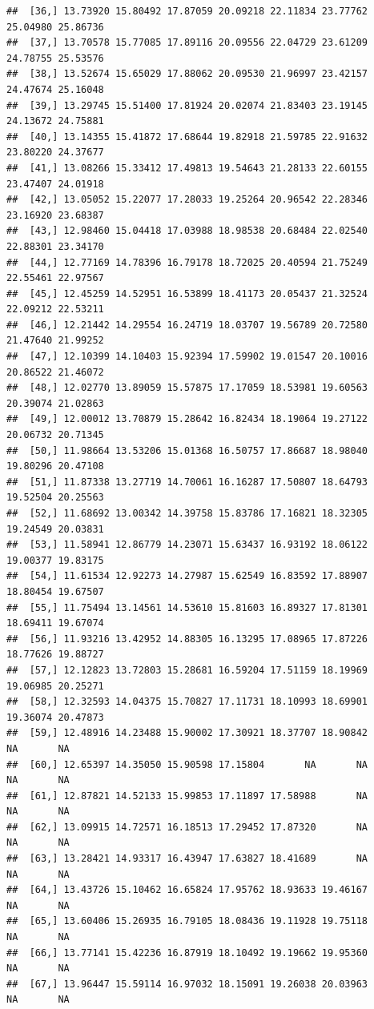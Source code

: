 \documentclass{article}\usepackage[]{graphicx}\usepackage[]{color}
\makeatletter
\newenvironment{kframe}{%
 \def\at@end@of@kframe{}%
 \ifinner\ifhmode%
  \def\at@end@of@kframe{\end{minipage}}%
  \begin{minipage}{\columnwidth}%
 \fi\fi%
 \def\FrameCommand##1{\hskip\@totalleftmargin \hskip-\fboxsep
 \colorbox{shadecolor}{##1}\hskip-\fboxsep
     \hskip-\linewidth \hskip-\@totalleftmargin \hskip\columnwidth}%
 \MakeFramed {\advance\hsize-\width
   \@totalleftmargin\z@ \linewidth\hsize
   \@setminipage}}%
 {\par\unskip\endMakeFramed%
 \at@end@of@kframe}
\newenvironment{knitrout}{}{} %
\makeatother
\begin{document}
\begin{knitrout}
\begin{kframe}
\begin{verbatim}
##  [36,] 13.73920 15.80492 17.87059 20.09218 22.11834 23.77762 25.04980 25.86736
##  [37,] 13.70578 15.77085 17.89116 20.09556 22.04729 23.61209 24.78755 25.53576
##  [38,] 13.52674 15.65029 17.88062 20.09530 21.96997 23.42157 24.47674 25.16048
##  [39,] 13.29745 15.51400 17.81924 20.02074 21.83403 23.19145 24.13672 24.75881
##  [40,] 13.14355 15.41872 17.68644 19.82918 21.59785 22.91632 23.80220 24.37677
##  [41,] 13.08266 15.33412 17.49813 19.54643 21.28133 22.60155 23.47407 24.01918
##  [42,] 13.05052 15.22077 17.28033 19.25264 20.96542 22.28346 23.16920 23.68387
##  [43,] 12.98460 15.04418 17.03988 18.98538 20.68484 22.02540 22.88301 23.34170
##  [44,] 12.77169 14.78396 16.79178 18.72025 20.40594 21.75249 22.55461 22.97567
##  [45,] 12.45259 14.52951 16.53899 18.41173 20.05437 21.32524 22.09212 22.53211
##  [46,] 12.21442 14.29554 16.24719 18.03707 19.56789 20.72580 21.47640 21.99252
##  [47,] 12.10399 14.10403 15.92394 17.59902 19.01547 20.10016 20.86522 21.46072
##  [48,] 12.02770 13.89059 15.57875 17.17059 18.53981 19.60563 20.39074 21.02863
##  [49,] 12.00012 13.70879 15.28642 16.82434 18.19064 19.27122 20.06732 20.71345
##  [50,] 11.98664 13.53206 15.01368 16.50757 17.86687 18.98040 19.80296 20.47108
##  [51,] 11.87338 13.27719 14.70061 16.16287 17.50807 18.64793 19.52504 20.25563
##  [52,] 11.68692 13.00342 14.39758 15.83786 17.16821 18.32305 19.24549 20.03831
##  [53,] 11.58941 12.86779 14.23071 15.63437 16.93192 18.06122 19.00377 19.83175
##  [54,] 11.61534 12.92273 14.27987 15.62549 16.83592 17.88907 18.80454 19.67507
##  [55,] 11.75494 13.14561 14.53610 15.81603 16.89327 17.81301 18.69411 19.67074
##  [56,] 11.93216 13.42952 14.88305 16.13295 17.08965 17.87226 18.77626 19.88727
##  [57,] 12.12823 13.72803 15.28681 16.59204 17.51159 18.19969 19.06985 20.25271
##  [58,] 12.32593 14.04375 15.70827 17.11731 18.10993 18.69901 19.36074 20.47873
##  [59,] 12.48916 14.23488 15.90002 17.30921 18.37707 18.90842       NA       NA
##  [60,] 12.65397 14.35050 15.90598 17.15804       NA       NA       NA       NA
##  [61,] 12.87821 14.52133 15.99853 17.11897 17.58988       NA       NA       NA
##  [62,] 13.09915 14.72571 16.18513 17.29452 17.87320       NA       NA       NA
##  [63,] 13.28421 14.93317 16.43947 17.63827 18.41689       NA       NA       NA
##  [64,] 13.43726 15.10462 16.65824 17.95762 18.93633 19.46167       NA       NA
##  [65,] 13.60406 15.26935 16.79105 18.08436 19.11928 19.75118       NA       NA
##  [66,] 13.77141 15.42236 16.87919 18.10492 19.19662 19.95360       NA       NA
##  [67,] 13.96447 15.59114 16.97032 18.15091 19.26038 20.03963       NA       NA

\end{verbatim}
\end{kframe}
\end{knitrout}
\end{document}

